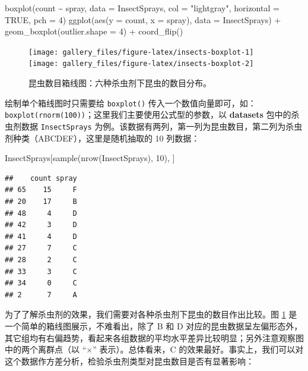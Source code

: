 \documentclass[
  b5paper,
  UTF8,twoside]{book}
\newenvironment{Shaded}{\begin{snugshade}}{\end{snugshade}}
\newcommand{\AttributeTok}[1]{\textcolor[rgb]{0.77,0.63,0.00}{#1}}
\newcommand{\ConstantTok}[1]{\textcolor[rgb]{0.00,0.00,0.00}{#1}}
\newcommand{\DecValTok}[1]{\textcolor[rgb]{0.00,0.00,0.81}{#1}}
\newcommand{\FunctionTok}[1]{\textcolor[rgb]{0.00,0.00,0.00}{#1}}
\newcommand{\NormalTok}[1]{#1}
\newcommand{\SpecialCharTok}[1]{\textcolor[rgb]{0.00,0.00,0.00}{#1}}
\newcommand{\StringTok}[1]{\textcolor[rgb]{0.31,0.60,0.02}{#1}}
\begin{document}
\begin{Shaded}
\begin{Highlighting}[]
\FunctionTok{boxplot}\NormalTok{(count }\SpecialCharTok{\textasciitilde{}}\NormalTok{ spray, }\AttributeTok{data =}\NormalTok{ InsectSprays,}
        \AttributeTok{col =} \StringTok{"lightgray"}\NormalTok{, }\AttributeTok{horizontal =} \ConstantTok{TRUE}\NormalTok{, }\AttributeTok{pch =} \DecValTok{4}\NormalTok{)}
\FunctionTok{ggplot}\NormalTok{(}\FunctionTok{aes}\NormalTok{(}\AttributeTok{y =}\NormalTok{ count, }\AttributeTok{x =}\NormalTok{ spray), }\AttributeTok{data =}\NormalTok{ InsectSprays) }\SpecialCharTok{+}
  \FunctionTok{geom\_boxplot}\NormalTok{(}\AttributeTok{outlier.shape =} \DecValTok{4}\NormalTok{) }\SpecialCharTok{+}
  \FunctionTok{coord\_flip}\NormalTok{()}
\end{Highlighting}
\end{Shaded}

\begin{figure}

{\centering \texttt{[image: gallery\_files/figure-latex/insects-boxplot-1]} \texttt{[image: gallery\_files/figure-latex/insects-boxplot-2]} 

}

\caption[各种杀虫剂下昆虫数目的箱线图]{昆虫数目箱线图：六种杀虫剂下昆虫的数目分布。}\label{fig:insects-boxplot}
\end{figure}

绘制单个箱线图时只需要给 \texttt{boxplot()} 传入一个数值向量即可，如：\texttt{boxplot(rnorm(100))}；这里我们主要使用公式型的参数，以 \textbf{datasets} 包中的杀虫剂数据 \texttt{InsectSprays} 为例。该数据有两列，第一列为昆虫数目，第二列为杀虫剂种类（ABCDEF），这里是随机抽取的 10 列数据：

\begin{Shaded}
\begin{Highlighting}[]
\NormalTok{InsectSprays[}\FunctionTok{sample}\NormalTok{(}\FunctionTok{nrow}\NormalTok{(InsectSprays), }\DecValTok{10}\NormalTok{), ]}
\end{Highlighting}
\end{Shaded}

\begin{verbatim}
##    count spray
## 65    15     F
## 20    17     B
## 48     4     D
## 42     3     D
## 41     4     D
## 27     7     C
## 28     2     C
## 33     3     C
## 34     0     C
## 2      7     A
\end{verbatim}

为了了解杀虫剂的效果，我们需要对各种杀虫剂下昆虫的数目作出比较。图 \ref{fig:insects-boxplot} 是一个简单的箱线图展示，不难看出，除了 B 和 D 对应的昆虫数据呈左偏形态外，其它组均有右偏趋势，看起来各组数据的平均水平差异比较明显；另外注意观察图中的两个离群点（以 ``\(\times\)'' 表示）。总体看来，C 的效果最好。事实上，我们可以对这个数据作方差分析，检验杀虫剂类型对昆虫数目是否有显著影响：
\end{document}
